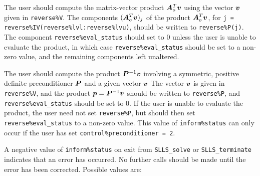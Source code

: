 \documentclass{galahad}
\newcommand{\packagename}{SLLS}
\begin{document}
\begin{description}
 The user should compute the matrix-vector product ${\bm{A}}_o^T {\bm{v}}$
     using the vector ${\bm{v}}$ given in {\tt reverse\%V}. The components
     $({\bm{A}}_o^T {\bm{v}})_j$ of the product ${\bm{A}}_o^T {\bm{v}}$, for
     {\tt j = reverse\%IV(reverse\%lvl:reverse\%lvu)},
     should be written to {\tt reverse\%P(j)}.
     The component {\tt reverse\%eval\_status} should set to 0 unless the
     user is unable to evaluate the product, in which case
     {\tt reverse\%eval\_status} should be set to a non-zero value, and the
      remaining components left unaltered.

 The user should compute the product ${\bm{P}}^{-1} {\bm{v}}$
     involving a symmetric, positive definite preconditioner ${\bm{P}}$ 
     and a given vector ${\bm{v}}$
     The vector ${\bm{v}}$ is given in {\tt reverse\%V}, and the
     product ${\bm{p}} = {\bm{P}}^{-1} {\bm{v}}$ should be written to {\tt reverse\%P},
     and  {\tt reverse\%eval\_status} should be set to 0.
     If the user is unable to evaluate the product,
     the user need not set {\tt reverse\%P}, but
     should then set {\tt reverse\%eval\_status} to a non-zero value.
     This value of {\tt inform\%status} can only occur if the user 
     has set {\tt control\%preconditioner = 2}.

\end{description}


\galerrors
A negative value of {\tt inform\%status} on exit from
{\tt \packagename\_solve}
or
{\tt \packagename\_terminate}
indicates that an error has occurred. No further calls should be made
until the error has been corrected. Possible values are:
\end{document}
